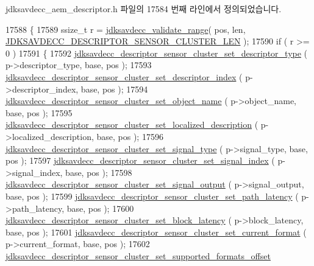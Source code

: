 jdksavdecc\+\_\+aem\+\_\+descriptor.\+h 파일의 17584 번째 라인에서 정의되었습니다.


\begin{DoxyCode}
17588 \{
17589     ssize\_t r = \hyperlink{group__util_ga9c02bdfe76c69163647c3196db7a73a1}{jdksavdecc\_validate\_range}( pos, len, 
      \hyperlink{group__descriptor__sensor__cluster_ga80124b9d585173d579cc6ed930af3be1}{JDKSAVDECC\_DESCRIPTOR\_SENSOR\_CLUSTER\_LEN} );
17590     \textcolor{keywordflow}{if} ( r >= 0 )
17591     \{
17592         \hyperlink{group__descriptor__sensor__cluster_gaa1f2882e83a9356fee7f7d40f1bf44a2}{jdksavdecc\_descriptor\_sensor\_cluster\_set\_descriptor\_type}
      ( p->descriptor\_type, base, pos );
17593         \hyperlink{group__descriptor__sensor__cluster_ga383eeb3be514aa8dead76d8793270dc2}{jdksavdecc\_descriptor\_sensor\_cluster\_set\_descriptor\_index}
      ( p->descriptor\_index, base, pos );
17594         \hyperlink{group__descriptor__sensor__cluster_gacb133e379b553da032aa7d2c764d8ba2}{jdksavdecc\_descriptor\_sensor\_cluster\_set\_object\_name}
      ( p->object\_name, base, pos );
17595         \hyperlink{group__descriptor__sensor__cluster_ga2b589ec646e76ad0d3117513741714a4}{jdksavdecc\_descriptor\_sensor\_cluster\_set\_localized\_description}
      ( p->localized\_description, base, pos );
17596         \hyperlink{group__descriptor__sensor__cluster_ga77ac0615868a207554b23f571195b555}{jdksavdecc\_descriptor\_sensor\_cluster\_set\_signal\_type}
      ( p->signal\_type, base, pos );
17597         \hyperlink{group__descriptor__sensor__cluster_ga84100f9d57d30ea2f783ce49c013f598}{jdksavdecc\_descriptor\_sensor\_cluster\_set\_signal\_index}
      ( p->signal\_index, base, pos );
17598         \hyperlink{group__descriptor__sensor__cluster_gaa4be2f9695dca82414db9877235ed55c}{jdksavdecc\_descriptor\_sensor\_cluster\_set\_signal\_output}
      ( p->signal\_output, base, pos );
17599         \hyperlink{group__descriptor__sensor__cluster_gadaacba2911b9ade158e9cef1b63c50c9}{jdksavdecc\_descriptor\_sensor\_cluster\_set\_path\_latency}
      ( p->path\_latency, base, pos );
17600         \hyperlink{group__descriptor__sensor__cluster_ga5cf8328302c731839fbb5de1771e1f35}{jdksavdecc\_descriptor\_sensor\_cluster\_set\_block\_latency}
      ( p->block\_latency, base, pos );
17601         \hyperlink{group__descriptor__sensor__cluster_ga47c88d90beae0c8a4ccd09d30c9d1b14}{jdksavdecc\_descriptor\_sensor\_cluster\_set\_current\_format}
      ( p->current\_format, base, pos );
17602         \hyperlink{group__descriptor__sensor__cluster_ga3767e700262b6b0534286d30c64bce22}{jdksavdecc\_descriptor\_sensor\_cluster\_set\_supported\_formats\_offset}

\end{DoxyCode}
